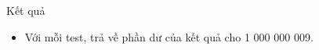 Kết quả
\begin{itemize}
	\item     Với mỗi test, trả về phần dư của kết quả cho 1 000 000 009.   
\end{itemize}